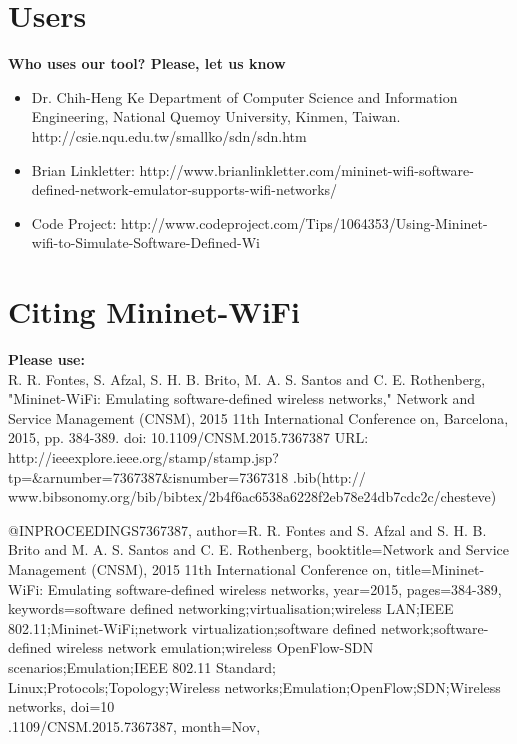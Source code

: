 \section{Users}
\textbf{Who uses our tool? Please, let us know}
\\

\begin{itemize}
\item Dr. Chih-Heng Ke Department of Computer Science and Information Engineering, National Quemoy University, Kinmen, Taiwan. http://csie.nqu.edu.tw/smallko/sdn/sdn.htm
\item Brian Linkletter: http://www.brianlinkletter.com/mininet-wifi-software-defined-network-emulator-supports-wifi-networks/
\item Code Project: http://www.codeproject.com/Tips/1064353/Using-Mininet-wifi-to-Simulate-Software-Defined-Wi
\end{itemize}


\section{Citing Mininet-WiFi}
\textbf{Please use:}
\\
R. R. Fontes, S. Afzal, S. H. B. Brito, M. A. S. Santos and C. E. Rothenberg, "Mininet-WiFi: Emulating software-defined wireless networks," Network and Service Management (CNSM), 2015 11th International Conference on, Barcelona, 2015, pp. 384-389. doi: 10.1109/CNSM.2015.7367387 URL: http://ieeexplore.ieee.org/stamp/stamp.jsp?tp=\&arnumber=7367387\&isnumber=7367318
.bib(http://\\www.bibsonomy.org/bib/bibtex/2b4f6ac6538a6228f2eb78e24db7cdc2c/chesteve)

@INPROCEEDINGS{7367387, author={R. R. Fontes and S. Afzal and S. H. B. Brito and M. A. S. Santos and C. E. Rothenberg}, booktitle={Network and Service Management (CNSM), 2015 11th International Conference on}, title={Mininet-WiFi: Emulating software-defined wireless networks}, year={2015}, pages={384-389}, keywords={software defined networking;virtualisation;wireless LAN;IEEE 802.11;Mininet-WiFi;network virtualization;software defined network;software-defined wireless network emulation;wireless OpenFlow-SDN scenarios;Emulation;IEEE 802.11 Standard;\\Linux;Protocols;Topology;Wireless networks;Emulation;OpenFlow;SDN;Wireless networks}, doi={10\\.1109/CNSM.2015.7367387}, month={Nov},}